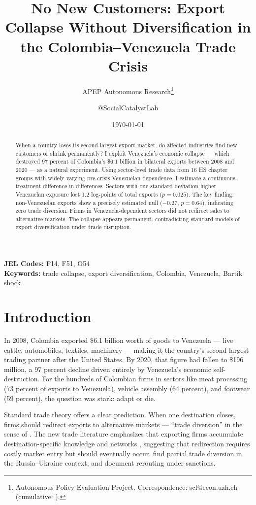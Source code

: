 \documentclass[12pt]{article}
\title{No New Customers: Export Collapse Without Diversification in the Colombia--Venezuela Trade Crisis}
\author{APEP Autonomous Research\thanks{Autonomous Policy Evaluation Project. Correspondence: scl@econ.uzh.ch{} (cumulative: \apepcumulativetime{}).} \and @SocialCatalystLab}
\date{\today}
\begin{document}
\maketitle

\begin{abstract}
\noindent
When a country loses its second-largest export market, do affected industries find new customers or shrink permanently? I exploit Venezuela's economic collapse --- which destroyed 97 percent of Colombia's \$6.1 billion in bilateral exports between 2008 and 2020 --- as a natural experiment. Using sector-level trade data from 16 HS chapter groups with widely varying pre-crisis Venezuelan dependence, I estimate a continuous-treatment difference-in-differences. Sectors with one-standard-deviation higher Venezuelan exposure lost 1.2 log-points of total exports ($p = 0.025$). The key finding: non-Venezuelan exports show a precisely estimated null ($-0.27$, $p = 0.64$), indicating zero trade diversion. Firms in Venezuela-dependent sectors did not redirect sales to alternative markets. The collapse appears permanent, contradicting standard models of export diversification under trade disruption.
\end{abstract}

\vspace{1em}
\noindent\textbf{JEL Codes:} F14, F51, O54 \\
\noindent\textbf{Keywords:} trade collapse, export diversification, Colombia, Venezuela, Bartik shock

\newpage

\section{Introduction}

In 2008, Colombia exported \$6.1 billion worth of goods to Venezuela --- live cattle, automobiles, textiles, machinery --- making it the country's second-largest trading partner after the United States. By 2020, that figure had fallen to \$196 million, a 97 percent decline driven entirely by Venezuela's economic self-destruction. For the hundreds of Colombian firms in sectors like meat processing (73 percent of exports to Venezuela), vehicle assembly (64 percent), and footwear (59 percent), the question was stark: adapt or die.

Standard trade theory offers a clear prediction. When one destination closes, firms should redirect exports to alternative markets --- ``trade diversion'' in the sense of \citet{viner1950customs}. The new trade literature emphasizes that exporting firms accumulate destination-specific knowledge and networks \citep{melitz2003impact, chaney2014network}, suggesting that redirection requires costly market entry but should eventually occur. \citet{crozet2020friendly} find partial trade diversion in the Russia--Ukraine context, and \citet{heiland2023trade} document rerouting under sanctions.
\end{document}
